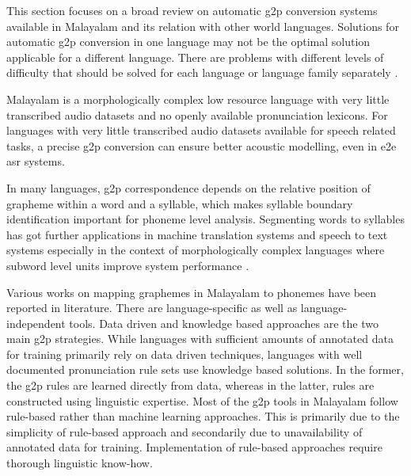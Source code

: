 This section focuses on a broad review on automatic \gls{g2p} conversion systems available in Malayalam and its relation with other world languages. Solutions for automatic \gls{g2p} conversion in one language may not be the
optimal solution applicable for a different language. There are problems with 
different levels of difficulty that should be solved for each language or
language family separately \cite{mdpi2022ruleg2p}. 

Malayalam is a
morphologically complex low resource language with very little transcribed
audio datasets and no openly available pronunciation lexicons.
For languages with very little transcribed audio datasets available for speech related tasks, a precise \gls{g2p} conversion can ensure better acoustic modelling, even in \gls{e2e} \cite{baevski2021unsupervised} \gls{asr} systems.

In many languages, \gls{g2p} correspondence
depends on the relative position of grapheme within a word and a syllable,
which makes syllable boundary identification  important for phoneme
level analysis. Segmenting words to syllables has got further applications in machine translation
systems and speech to text systems especially in the context of morphologically
complex languages where subword level units improve system performance
\cite{kunchukuttan2016, SMIT2021101158}. 





Various works on mapping graphemes in Malayalam to phonemes have been reported in literature. There are language-specific as well as language-independent tools. Data driven and knowledge based approaches are the two main \gls{g2p} strategies. While languages with sufficient amounts of annotated data for training primarily rely on data driven techniques, languages with well documented pronunciation rule sets use knowledge based solutions. In the former, the \gls{g2p} rules are learned directly from data, whereas in the latter, rules are constructed using linguistic expertise.
Most of the  \gls{g2p} tools in Malayalam follow rule-based rather than machine learning approaches. This is primarily due to the simplicity of rule-based approach and secondarily due to unavailability of annotated data for training. Implementation of rule-based approaches require thorough linguistic know-how.

